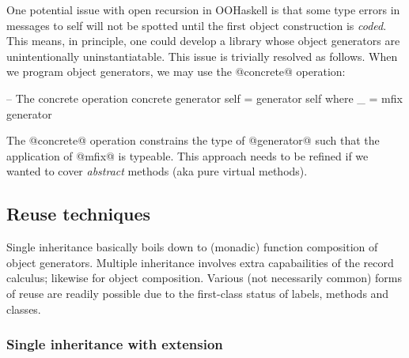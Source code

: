 \documentclass{jfp}
\begin{document}
One potential issue with open recursion in OOHaskell is that some type
errors in messages to self will not be spotted until the first object
construction is \emph{coded}. This means, in principle, one could
develop a library whose object generators are unintentionally
uninstantiatable. This issue is trivially resolved as follows. When we
program object generators, we may use the @concrete@ operation:


\begin{code}
 -- The concrete operation
 concrete generator self = generator self
  where
   _ = mfix generator
\end{code}

The @concrete@ operation constrains the type of @generator@ such that
the application of @mfix@ is typeable. This approach needs to be
refined if we wanted to cover \emph{abstract} methods (aka pure
virtual methods).






\subsection{Reuse techniques}

Single inheritance basically boils down to (monadic) function
composition of object generators. Multiple inheritance involves extra
capabailities of the record calculus; likewise for object
composition. Various (not necessarily common) forms of reuse are
readily possible due to the first-class status of labels, methods and
classes.






\subsubsection{Single inheritance with extension}
\label{sec:single-inheritance:extension}
\end{document}
